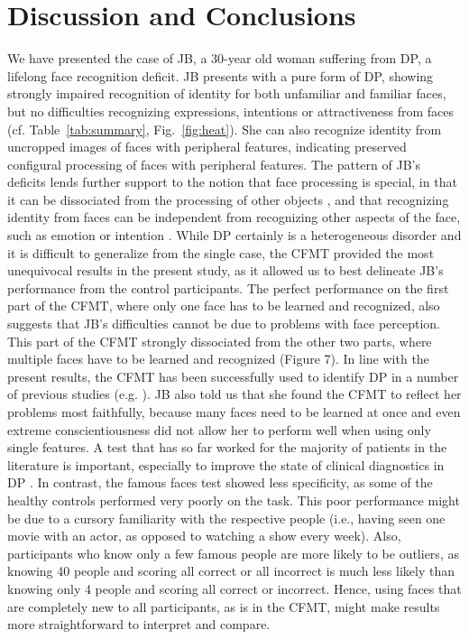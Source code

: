 \documentclass[fleqn,10pt]{SelfArx} %
\begin{document}
\section{Discussion and Conclusions}

We have presented the case of JB, a 30-year old woman suffering from DP, a lifelong face recognition deficit. JB presents with a pure form of DP, showing strongly impaired recognition of identity for both unfamiliar and familiar faces, but no difficulties recognizing expressions, intentions or attractiveness from faces (cf. Table~\ref{tab:summary}, Fig.~\ref{fig:heat}). She can also recognize identity from uncropped images of faces with peripheral features, indicating preserved configural processing of faces with peripheral features.
The pattern of JB's deficits lends further support to the notion that face processing is special, in that it can be dissociated from the processing of other objects \citep{McKone_2011}, and that recognizing identity from faces can be independent from recognizing other aspects of the face, such as emotion or intention \citep{Haxby_2000, Calder_2005}.
While DP certainly is a heterogeneous disorder \citep{Duchaine_2006curr, Le_Grand_2006} and it is difficult to generalize from the single case, the CFMT provided the most unequivocal results in the present study, as it allowed us to best delineate JB's performance from the control participants. The perfect performance on the first part of the CFMT, where only one face has to be learned and recognized, also suggests that JB’s difficulties cannot be due to problems with face perception. This part of the CFMT strongly dissociated from the other two parts, where multiple faces have to be learned and recognized (Figure 7). In line with the present results, the CFMT has been successfully used to identify DP in a number of previous studies (e.g. \citet{Duchaine_2006cfmt, Duchaine_2006cog}). JB also told us that she found the CFMT to reflect her problems most faithfully, because many faces need to be learned at once and even extreme conscientiousness did not allow her to perform well when using only single features. A test that has so far worked for the majority of patients in the literature is important, especially to improve the state of clinical diagnostics in DP \citep{Shah_2016, Bate_2017}.
In contrast, the famous faces test showed less specificity, as some of the healthy controls performed very poorly on the task. This poor performance might be due to a cursory familiarity with the respective people (i.e., having seen one movie with an actor, as opposed to watching a show every week). Also, participants who know only a few famous people are more likely to be outliers, as knowing 40 people and scoring all correct or all incorrect is much less likely than knowing only 4 people and scoring all correct or incorrect. Hence, using faces that are completely new to all participants, as is in the CFMT, might make results more straightforward to interpret and compare.
\end{document}
